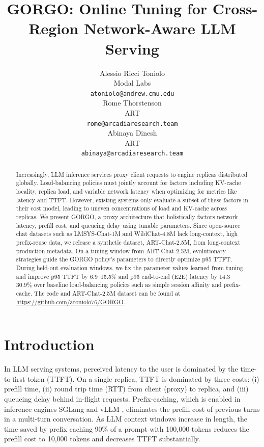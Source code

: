 \documentclass{article}
\title{GORGO: Online Tuning for Cross-Region Network-Aware LLM Serving}
\author{
  Alessio Ricci Toniolo \\
  Modal Labs \\
  \texttt{atoniolo@andrew.cmu.edu} \\
  \And
  Rome Thorstenson \\
  ART \\
  \texttt{rome@arcadiaresearch.team} \\
  \And
  Abinaya Dinesh \\
  ART \\
  \texttt{abinaya@arcadiaresearch.team} \\
}
\begin{document}
\maketitle

\begin{abstract}
Increasingly, LLM inference services proxy client requests to engine replicas distributed globally.
Load-balancing policies must jointly account for
factors including KV-cache locality, replica load, and variable network latency when
optimizing for metrics like latency and TTFT.
However, existing systems only evaluate a subset of these factors in their cost
model, leading to uneven concentrations of load and KV-cache across replicas. We
present GORGO, a proxy architecture that holistically factors network latency,
prefill cost, and queueing delay using tunable parameters. Since open-source chat
datasets such as LMSYS-Chat-1M and WildChat-4.8M lack long-context, high
prefix-reuse data, we release a synthetic dataset, ART-Chat-2.5M, from
long-context production metadata. On a tuning window from ART-Chat-2.5M,
evolutionary strategies guide the GORGO policy's parameters to directly optimize
p95 TTFT. During held-out evaluation windows, we fix the parameter values learned
from tuning and improve p95 TTFT by 6.9--15.5\% and p95 end-to-end (E2E) latency by
14.3--30.9\% over baseline load-balancing policies such as simple session affinity
and prefix-cache.
The code and ART-Chat-2.5M dataset can be found at \href{https://github.com/atoniolo76/GORGO}{https://github.com/atoniolo76/GORGO}.
\end{abstract}

\section{Introduction}
\label{sec:intro}

In LLM serving systems, perceived latency to the user is dominated by the time-to-first-token (TTFT). On a single replica, TTFT is dominated by three costs: (i) prefill time, (ii) round trip time (RTT) from client (proxy) to replica, and (iii) queueing delay behind in-flight requests. Prefix-caching, which is enabled in inference engines SGLang \citep{sglang2024} and vLLM \citep{vllm2023}, eliminates the prefill cost of previous turns in a multi-turn conversation. As LLM context windows increase in length, the time saved by prefix caching 90\% of a prompt with 100,000 tokens reduces the prefill cost to 10,000 tokens and decreases TTFT substantially.
\end{document}
